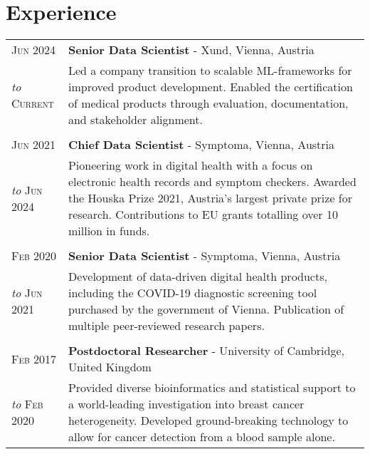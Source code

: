 \section{Experience}
\begin{tabular}{>{\raggedleft}p{2.15cm}|p{12cm}}

	\textsc{Jun 2024} &  \textbf{Senior Data Scientist} - Xund, Vienna, Austria \\
	\emph{to} \textsc{Current} & Led a company transition to scalable ML-frameworks for improved product development. Enabled the certification of medical products through evaluation, documentation, and stakeholder alignment. \\
	\multicolumn{2}{c}{}\\

	\textsc{Jun 2021} &  \textbf{Chief Data Scientist} - Symptoma, Vienna, Austria \\
	\emph{to} \textsc{Jun 2024} & Pioneering work in digital health with a focus on electronic health records and symptom checkers. Awarded the Houska Prize 2021, Austria's largest private prize for research. Contributions to EU grants totalling over 10 million in funds. \\

	\multicolumn{2}{c}{}\\

    \textsc{Feb 2020} & \textbf{Senior Data Scientist} - Symptoma, Vienna, Austria \\
	\emph{to} \textsc{Jun 2021} & Development of data-driven digital health products, including the COVID-19 diagnostic screening tool purchased by the government of Vienna. Publication of multiple peer-reviewed research papers. \\
	\multicolumn{2}{c}{}\\


    \textsc{Feb 2017} &  \textbf{Postdoctoral Researcher} - University of Cambridge, United Kingdom\\
	\emph{to} \textsc{Feb 2020} & Provided diverse bioinformatics and statistical support to a world-leading investigation into breast cancer heterogeneity. Developed ground-breaking technology to allow for cancer detection from a blood sample alone. \\




\end{tabular}
